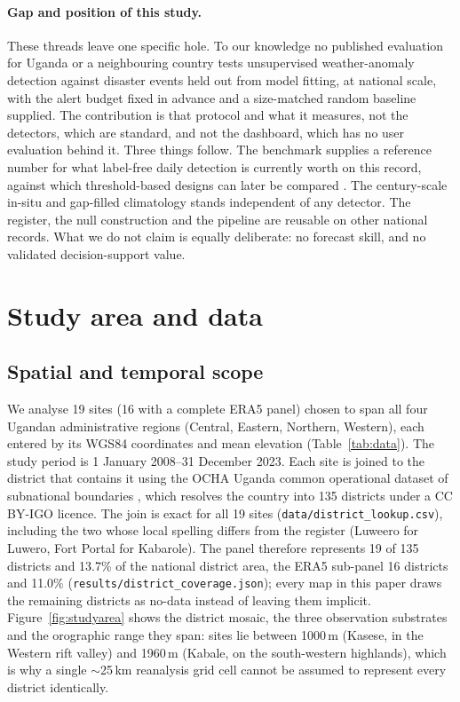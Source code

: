 \documentclass[preprint,12pt]{elsarticle}
\begin{document}
\paragraph{Gap and position of this study.}
These threads leave one specific hole. To our knowledge no published evaluation
for Uganda or a neighbouring country tests unsupervised weather-anomaly
detection against disaster events held out from model fitting, at national
scale, with the alert budget fixed in advance and a size-matched random baseline
supplied. The contribution is that protocol and what it measures, not the
detectors, which are standard, and not the dashboard, which has no user
evaluation behind it. Three things follow. The benchmark supplies a reference
number for what label-free daily detection is currently worth on this record,
against which threshold-based designs can later be compared \cite{guzzetti2020}.
The century-scale in-situ and gap-filled climatology stands independent of any
detector. The register, the null construction and the pipeline are reusable on
other national records. What we do not claim is equally deliberate: no forecast
skill, and no validated decision-support value.

\section{Study area and data}\label{sec:data}
\subsection{Spatial and temporal scope}
We analyse 19 sites (16 with a complete ERA5 panel) chosen to span all four
Ugandan administrative regions (Central, Eastern, Northern, Western), each
entered by its WGS84 coordinates and mean elevation (Table~\ref{tab:data}). The
study period is 1 January 2008--31 December 2023. Each site is joined to the
district that contains it using the OCHA Uganda common operational dataset of
subnational boundaries \cite{uchacod2020}, which resolves the country into 135
districts under a CC BY-IGO licence. The join is exact for all 19 sites
(\texttt{data/district\_lookup.csv}), including the two whose local spelling
differs from the register (Luweero for Luwero, Fort Portal for Kabarole). The
panel therefore represents 19 of 135 districts and 13.7\% of the national
district area, the ERA5 sub-panel 16 districts and 11.0\%
(\texttt{results/district\_coverage.json}); every map in this paper draws the
remaining districts as no-data instead of leaving them implicit.
Figure~\ref{fig:studyarea} shows the district mosaic, the three observation
substrates and the orographic range they
span: sites lie between 1000\,m (Kasese, in the Western rift valley) and
1960\,m (Kabale, on the south-western highlands), which is why a single
$\sim$25\,km reanalysis grid cell cannot be assumed to represent every district
identically.
\end{document}
